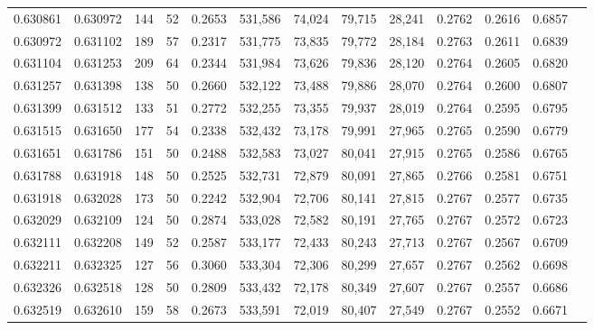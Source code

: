 \begin{tabular}{rrrrrrrrrrrrr}
0.630861 & 0.630972 &   144 &  52 &                                     0.2653 & 531,586 &  74,024 &  79,715 &  28,241 & 0.2762 & 0.2616 & 0.6857 \\
0.630972 & 0.631102 &   189 &  57 &                                     0.2317 & 531,775 &  73,835 &  79,772 &  28,184 & 0.2763 & 0.2611 & 0.6839 \\
0.631104 & 0.631253 &   209 &  64 &                                     0.2344 & 531,984 &  73,626 &  79,836 &  28,120 & 0.2764 & 0.2605 & 0.6820 \\
0.631257 & 0.631398 &   138 &  50 &                                     0.2660 & 532,122 &  73,488 &  79,886 &  28,070 & 0.2764 & 0.2600 & 0.6807 \\
0.631399 & 0.631512 &   133 &  51 &                                     0.2772 & 532,255 &  73,355 &  79,937 &  28,019 & 0.2764 & 0.2595 & 0.6795 \\
0.631515 & 0.631650 &   177 &  54 &                                     0.2338 & 532,432 &  73,178 &  79,991 &  27,965 & 0.2765 & 0.2590 & 0.6779 \\
0.631651 & 0.631786 &   151 &  50 &                                     0.2488 & 532,583 &  73,027 &  80,041 &  27,915 & 0.2765 & 0.2586 & 0.6765 \\
0.631788 & 0.631918 &   148 &  50 &                                     0.2525 & 532,731 &  72,879 &  80,091 &  27,865 & 0.2766 & 0.2581 & 0.6751 \\
0.631918 & 0.632028 &   173 &  50 &                                     0.2242 & 532,904 &  72,706 &  80,141 &  27,815 & 0.2767 & 0.2577 & 0.6735 \\
0.632029 & 0.632109 &   124 &  50 &                                     0.2874 & 533,028 &  72,582 &  80,191 &  27,765 & 0.2767 & 0.2572 & 0.6723 \\
0.632111 & 0.632208 &   149 &  52 &                                     0.2587 & 533,177 &  72,433 &  80,243 &  27,713 & 0.2767 & 0.2567 & 0.6709 \\
0.632211 & 0.632325 &   127 &  56 &                                     0.3060 & 533,304 &  72,306 &  80,299 &  27,657 & 0.2767 & 0.2562 & 0.6698 \\
0.632326 & 0.632518 &   128 &  50 &                                     0.2809 & 533,432 &  72,178 &  80,349 &  27,607 & 0.2767 & 0.2557 & 0.6686 \\
0.632519 & 0.632610 &   159 &  58 &                                     0.2673 & 533,591 &  72,019 &  80,407 &  27,549 & 0.2767 & 0.2552 & 0.6671 \\

\end{tabular}
